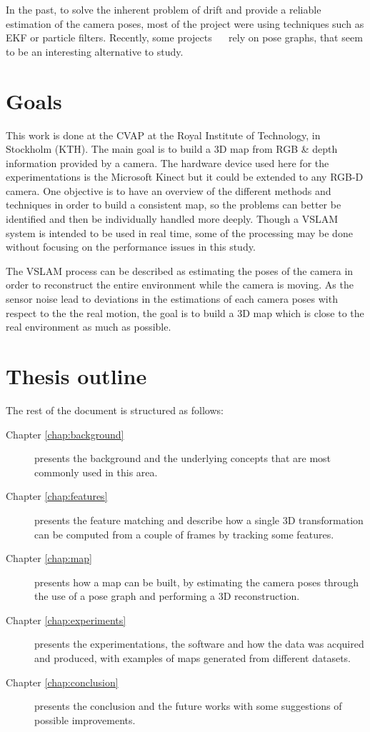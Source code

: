 In the past, to solve the inherent problem of drift and provide a reliable estimation of the camera poses, most of the project were using techniques such as \gls{EKF} or particle filters. Recently, some projects ~\cite{Intel_RGBD_2010}~\cite{engelhard11euron-workshop} rely on pose graphs, that seem to be an interesting alternative to study.

\section{Goals}

This work is done at the \gls{CVAP} at the Royal Institute of Technology, in Stockholm (KTH). The main goal is to build a 3D map from RGB \& depth information provided by a camera. The hardware device used here for the experimentations is the Microsoft Kinect but it could be extended to any RGB-D camera. One objective is to have an overview of the different methods and techniques in order to build a consistent map, so the problems can better be identified and then be individually handled more deeply. Though a \gls{VSLAM} system is intended to be used in real time, some of the processing may be done without focusing on the performance issues in this study. 

The \gls{VSLAM} process can be described as estimating the poses of the camera in order to reconstruct the entire environment while the camera is moving. As the sensor noise lead to deviations in the estimations of each camera poses with respect to the the real motion, the goal is to build a 3D map which is close to the real environment as much as possible.

\section{Thesis outline}

The rest of the document is structured as follows:
\begin{description}
\item[Chapter \ref{chap:background}] presents the background and the underlying concepts that are most commonly used in this area.
\item[Chapter \ref{chap:features}] presents the feature matching and describe how a single 3D transformation can be computed  from a couple of frames by tracking some features.
\item[Chapter \ref{chap:map}] presents how a map can be built, by estimating the camera poses through the use of a pose graph and performing a 3D reconstruction.
\item[Chapter \ref{chap:experiments}] presents the experimentations, the software and how the data was acquired and produced, with examples of maps generated from different datasets.
\item[Chapter \ref{chap:conclusion}] presents the conclusion and the future works with some suggestions of possible improvements.
\end{description}

